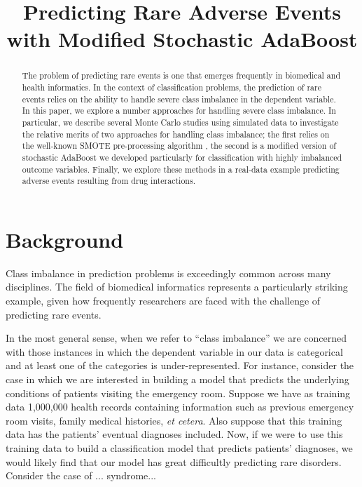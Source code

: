 \documentclass[10pt]{article}
\title{\fontsize{14}{14} Predicting Rare Adverse Events with Modified Stochastic AdaBoost}
\author{}
\date{}
\begin{document}
\maketitle

\begin{abstract}
The problem of predicting rare events is one that emerges frequently in biomedical and health informatics. In the context of classification problems, the prediction of rare events relies on the ability to handle severe class imbalance in the dependent variable. In this paper, we explore a number approaches for handling severe class imbalance. In particular, we describe several Monte Carlo studies using simulated data to investigate the relative merits of two approaches for handling class imbalance; the first relies on the well-known SMOTE pre-processing algorithm \cite{chawla02}, the second is a modified version of stochastic AdaBoost we developed particularly for classification with highly imbalanced outcome variables. Finally, we explore these methods in a real-data example predicting adverse events resulting from drug interactions. 
\end{abstract}

\section{Background}

Class imbalance in prediction problems is exceedingly common across many disciplines. The field of biomedical informatics represents a particularly striking example, given how frequently researchers are faced with the challenge of predicting rare events. 

In the most general sense, when we refer to ``class imbalance'' we are concerned with those instances in which the dependent variable in our data is categorical and at least one of the categories is under-represented. For instance, consider the case in which we are interested in building a model that predicts the underlying conditions of patients visiting the emergency room. Suppose we have as training data 1,000,000 health records containing information such as previous emergency room visits, family medical histories, \textit{et cetera}. Also suppose that this training data has the patients' eventual diagnoses included. Now, if we were to use this training data to build a classification model that predicts patients' diagnoses, we would likely find that our model has great difficultly predicting rare disorders. Consider the case of ... syndrome...
\end{document}

